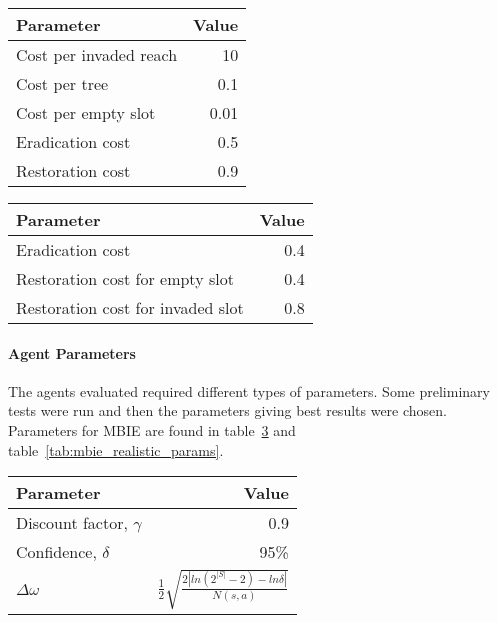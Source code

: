 \begin{table}[H]
\centering
{} \label{tab:cost_params} 
\begin{tabular}{lr}
 \toprule
 Parameter & Value \\
 \midrule
 Cost per invaded reach & 10 \\
 Cost per tree & 0.1 \\
 Cost per empty slot & 0.01 \\
 Eradication cost & 0.5 \\
 Restoration cost & 0.9 \\
 \bottomrule
\end{tabular}
\end{table}

\begin{table}[H]
\centering
 \begin{tabular}{lr}
 \toprule
 Parameter & Value \\
 \midrule
 Eradication cost & 0.4 \\
 Restoration cost for empty slot & 0.4 \\
 Restoration cost for invaded slot & 0.8 \\
 \bottomrule
\end{tabular}
\label{tab:cost_params_var}
\end{table}

\paragraph{Agent Parameters}

The agents evaluated required different types of parameters. Some preliminary
tests were run and then the parameters giving best results were chosen.
Parameters for MBIE are found in table~\ref{tab:mbie_params} and
table~\ref{tab:mbie_realistic_params}.

\begin{table}[H]
    \centering
    \label{tab:mbie_params} 
    \begin{tabular}{lr}
     \toprule
     Parameter & Value \\
     \midrule
     Discount factor, $\gamma$ & 0.9 \\
     Confidence, $\delta$ & 95\% \\
     $\Delta \omega$ & $\frac{1}{2}\sqrt{\frac{2|ln(2^{|S|}-2) - ln  \delta |}{N(s,a)}}$ \\
     
     \bottomrule
    \end{tabular}
\end{table}

